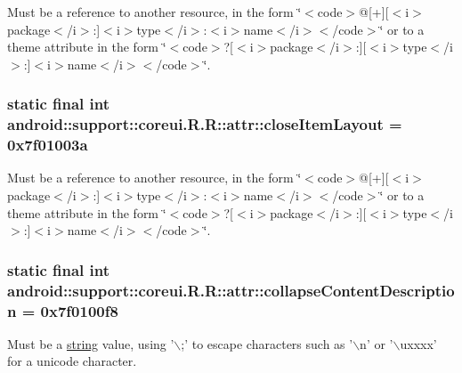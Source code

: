 Must be a reference to another resource, in the form \char`\"{}$<$code$>$@\mbox{[}+\mbox{]}\mbox{[}$<$i$>$package$<$/i$>$:\mbox{]}$<$i$>$type$<$/i$>$:$<$i$>$name$<$/i$>$$<$/code$>$\char`\"{} or to a theme attribute in the form \char`\"{}$<$code$>$?\mbox{[}$<$i$>$package$<$/i$>$:\mbox{]}\mbox{[}$<$i$>$type$<$/i$>$:\mbox{]}$<$i$>$name$<$/i$>$$<$/code$>$\char`\"{}. \hypertarget{classandroid_1_1support_1_1coreui_1_1_r_1_1attr_bd359fbca06065b0ad601aa6ccaa0515}{
\subsubsection[{closeItemLayout}]{\setlength{\rightskip}{0pt plus 5cm}static final int android::support::coreui.R.R::attr::closeItemLayout = 0x7f01003a}}
\label{classandroid_1_1support_1_1coreui_1_1_r_1_1attr_bd359fbca06065b0ad601aa6ccaa0515}


Must be a reference to another resource, in the form \char`\"{}$<$code$>$@\mbox{[}+\mbox{]}\mbox{[}$<$i$>$package$<$/i$>$:\mbox{]}$<$i$>$type$<$/i$>$:$<$i$>$name$<$/i$>$$<$/code$>$\char`\"{} or to a theme attribute in the form \char`\"{}$<$code$>$?\mbox{[}$<$i$>$package$<$/i$>$:\mbox{]}\mbox{[}$<$i$>$type$<$/i$>$:\mbox{]}$<$i$>$name$<$/i$>$$<$/code$>$\char`\"{}. \hypertarget{classandroid_1_1support_1_1coreui_1_1_r_1_1attr_f430ccdf9d1268e9b5abe90a4d5c2766}{
\subsubsection[{collapseContentDescription}]{\setlength{\rightskip}{0pt plus 5cm}static final int android::support::coreui.R.R::attr::collapseContentDescription = 0x7f0100f8}}
\label{classandroid_1_1support_1_1coreui_1_1_r_1_1attr_f430ccdf9d1268e9b5abe90a4d5c2766}


Must be a \hyperlink{classandroid_1_1support_1_1coreui_1_1_r_1_1string}{string} value, using '$\backslash$;' to escape characters such as '$\backslash$n' or '$\backslash$uxxxx' for a unicode character. 

